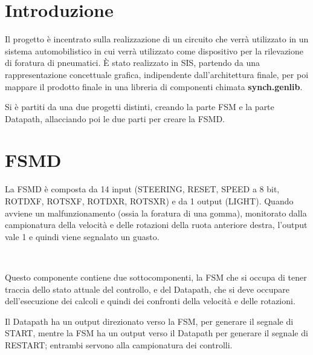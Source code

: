 \documentclass[a4paper,titlepage]{book}
\begin{document}
\begin{frontespizio}


\end{frontespizio}

\tableofcontents

\newpage

\chapter{Introduzione}

Il progetto è incentrato sulla realizzazione di un circuito che verrà utilizzato in un sistema automobilistico in cui verrà utilizzato come dispositivo per la rilevazione di foratura di pneumatici. È stato realizzato in SIS, partendo da una rappresentazione concettuale grafica, indipendente dall'architettura finale, per poi mappare il prodotto finale in una libreria di componenti chimata \textbf{synch.genlib}.

Si è partiti da una due progetti distinti, creando la parte FSM e la parte Datapath, allacciando poi le due parti per creare la FSMD.


\chapter{FSMD}

La FSMD è composta da 14 input (STEERING, RESET, SPEED a 8 bit, ROTDXF, ROTSXF, ROTDXR, ROTSXR) e da 1 output (LIGHT). Quando avviene un malfunzionamento (ossia la foratura di una gomma), monitorato dalla campionatura della velocità e delle rotazioni della ruota anteriore destra, l'output vale 1 e quindi viene segnalato un guasto.

~

Questo componente contiene due sottocomponenti, la FSM che si occupa di tener traccia dello stato attuale del controllo, e del Datapath, che si deve occupare dell'esecuzione dei calcoli e quindi dei confronti della velocità e delle rotazioni.

Il Datapath ha un output direzionato verso la FSM, per generare il segnale di START, mentre la FSM ha un output verso il Datapath per generare il segnale di RESTART; entrambi servono alla campionatura dei controlli.
\end{document}
